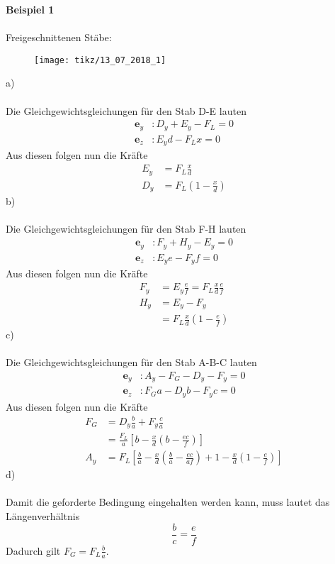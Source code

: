 \textbf{Beispiel 1}\\ \\
Freigeschnittenen Stäbe:
\begin{figure}[h]
	\centering
	\texttt{[image: tikz/13\_07\_2018\_1]}
\end{figure}
\newpage
\noindent
a)\\ \\
Die Gleichgewichtsgleichungen für den Stab D-E lauten
\begin{align*}
	\textbf{e}_y &: D_y + E_y - F_L = 0\\
	\textbf{e}_z &: E_yd - F_Lx = 0 
\end{align*}
Aus diesen folgen nun die Kräfte
\begin{align*}
	E_y &= F_L \frac{x}{d} \\
	D_y &= F_L \left(1 - \frac{x}{d}\right)
\end{align*}
b)\\ \\
Die Gleichgewichtsgleichungen für den Stab F-H lauten
\begin{align*}
	\textbf{e}_y &: F_y + H_y - E_y = 0\\
	\textbf{e}_z &: E_ye - F_yf = 0
\end{align*}
Aus diesen folgen nun die Kräfte
\begin{align*}
	F_y &= E_y \frac{e}{f} = F_L \frac{x}{d}\frac{e}{f} \\
	H_y &= E_y - F_y \\
		&= F_L \frac{x}{d}\left(1 - \frac{e}{f}\right)
\end{align*}
c)\\ \\
Die Gleichgewichtsgleichungen für den Stab A-B-C lauten
\begin{align*}
	\textbf{e}_y &: A_y - F_G - D_y - F_y = 0\\
	\textbf{e}_z &: F_Ga - D_yb - F_yc = 0
\end{align*}
Aus diesen folgen nun die Kräfte
\begin{align*}
	F_G &= D_y\frac{b}{a} + F_y\frac{c}{a} \\
		&= \frac{F_L}{a}\left[b - \frac{x}{d}\left(b - \frac{ec}{f}\right)\right] \\
	A_y &= F_L\left[\frac{b}{a} - \frac{x}{d}\left(\frac{b}{a} - \frac{ec}{af}\right) + 1 - \frac{x}{d}\left(1 - \frac{e}{f}\right)\right]
\end{align*}
d)\\ \\
Damit die geforderte Bedingung eingehalten werden kann, muss lautet das Längenverhältnis
\[
	\frac{b}{c} = \frac{e}{f}
\]
Dadurch gilt $F_G = F_L\frac{b}{a}$.
